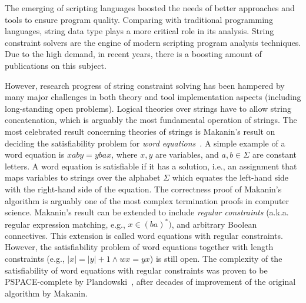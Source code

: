 
The emerging of scripting languages boosted the needs of better approaches and tools to ensure program quality.
Comparing with traditional programming languages, string data type plays a more critical role in its analysis.
String constraint solvers are the engine of modern scripting program analysis techniques. 
Due to the high demand, in recent years, there is a boosting amount of publications on this subject.

However, research progress of string constraint solving has been hampered by many major challenges in both theory and tool implementation aspects (including long-standing open problems). 
Logical theories over strings have to allow string concatenation, which is arguably the most fundamental operation of strings. 
The most celebrated result concerning theories of strings is Makanin’s result on deciding the satisfiability problem for \emph{word equations}~\cite{makanin77}.
A simple example of a word equation is $xaby = ybax$, where $x, y$ are variables, and $a, b \in \Sigma$ are constant letters. 
A word equation is satisfiable if it has a solution, i.e., an assignment that maps variables to strings over the alphabet $\Sigma$ which equates the left-hand side with the right-hand side of the equation.
The correctness proof of Makanin’s algorithm is arguably one of the most complex termination proofs in computer science. 
Makanin’s result can be extended to include \emph{regular constraints} (a.k.a. regular expression matching, e.g., $x \in (ba)^*)$, and arbitrary Boolean connectives.
This extension is called word equations with regular constraints. 
However, the satisfiability problem of word equations together with length constraints (e.g., $\vert x\vert =\vert y\vert +1 \wedge wx=yx$) is still open.
The complexity of the satisfiability of word equations with regular constraints was proven to be PSPACE-complete by Plandowski~\cite{plandowski99}, after decades of improvement of the original algorithm by Makanin.


